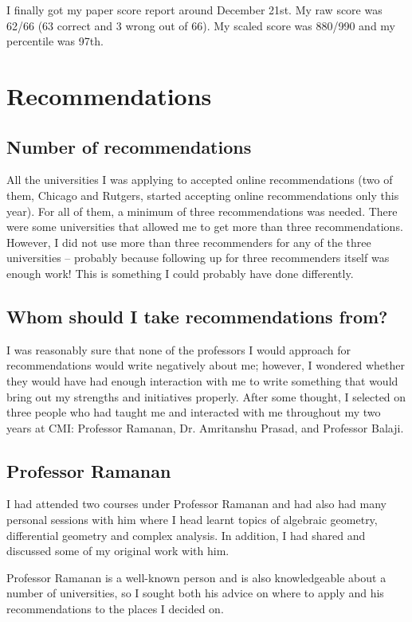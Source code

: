 \documentclass[a4paper]{amsart}
\begin{document}
I finally got my paper score report around December 21st. My raw score
was 62/66 (63 correct and 3 wrong out of 66). My scaled score was 880/990
and my percentile was 97th.

\section{Recommendations}

\subsection{Number of recommendations}

All the universities I was applying to accepted online recommendations
(two of them, Chicago and Rutgers, started accepting online
recommendations only this year). For all of them, a minimum of three
recommendations was needed. There were some universities that allowed
me to get more than three recommendations. However, I did not use
more than three recommenders for any of the three universities -- probably
because following up for three recommenders itself was enough work!
This is something I could probably have done differently.

\subsection{Whom should I take recommendations from?}

I was reasonably sure that none of the professors I would approach for
recommendations would write negatively about me; however, I wondered
whether they would have had enough interaction with me to write
something that would bring out my strengths and initiatives properly.
After some thought, I selected on three people who had taught me and
interacted with me throughout my two years at CMI: Professor Ramanan,
Dr. Amritanshu Prasad, and Professor Balaji.

\subsection{Professor Ramanan}

I had attended two courses under Professor Ramanan and had also had
many personal sessions with him where I head learnt topics of algebraic
geometry, differential geometry and complex analysis. In addition,
I had shared and discussed some of my original work with him.

Professor Ramanan is a well-known person and is also knowledgeable
about a number of universities, so I sought both his advice on where
to apply and his recommendations to the places I decided on.
\end{document}
